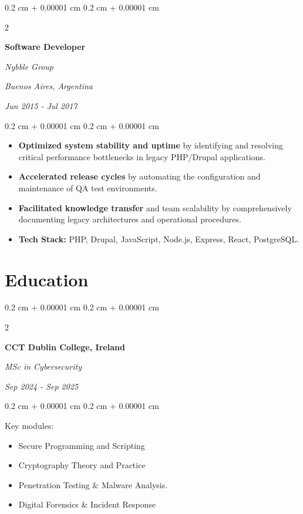 \documentclass[10pt, letterpaper]{article}
\newenvironment{highlights}{
    \begin{itemize}[
        topsep=0.10 cm,
        parsep=0.10 cm,
        partopsep=0pt,
        itemsep=0pt,
        leftmargin=0.4 cm + 10pt
    ]
}{
    \end{itemize}
} %
\newenvironment{onecolentry}{
    \begin{adjustwidth}{
        0.2 cm + 0.00001 cm
    }{
        0.2 cm + 0.00001 cm
    }
}{
    \end{adjustwidth}
} %
\newenvironment{twocolentry}[2][]{
    \onecolentry
    \def\secondColumn{#2}
    \setcolumnwidth{\fill, 4.5 cm}
    \begin{paracol}{2}
}{
    \switchcolumn \raggedleft \secondColumn
    \end{paracol}
    \endonecolentry
} %
\begin{document}
        \vspace{0.2 cm}

        \begin{twocolentry}{
        \textit{Buenos Aires, Argentina}

        \textit{Jun 2015 - Jul 2017}}
            \textbf{Software Developer}

            \textit{Nybble Group}
        \end{twocolentry}

        \vspace{0.10 cm}
        \begin{onecolentry}
            \begin{highlights}
                \item \textbf{Optimized system stability and uptime} by identifying and resolving critical performance bottlenecks in legacy PHP/Drupal applications.
                \item \textbf{Accelerated release cycles} by automating the configuration and maintenance of QA test environments.
                \item \textbf{Facilitated knowledge transfer} and team scalability by comprehensively documenting legacy architectures and operational procedures.
                \item \textbf{Tech Stack:} PHP, Drupal, JavaScript, Node.js, Express, React, PostgreSQL.
            \end{highlights}
        \end{onecolentry}

    \section{Education}


        \begin{twocolentry}{
        \textit{Sep 2024 - Sep 2025}}
            \textbf{CCT Dublin College, Ireland}

            \textit{MSc in Cybersecurity}
        \end{twocolentry}

        \vspace{0.10 cm}
        \begin{onecolentry}
        Key modules:
            \begin{highlights}
                \item Secure Programming and Scripting
                \item Cryptography Theory and Practice
                \item Penetration Testing \& Malware Analysis.
                \item Digital Forensics \& Incident Response
            \end{highlights}
        \end{onecolentry}
\end{document}
